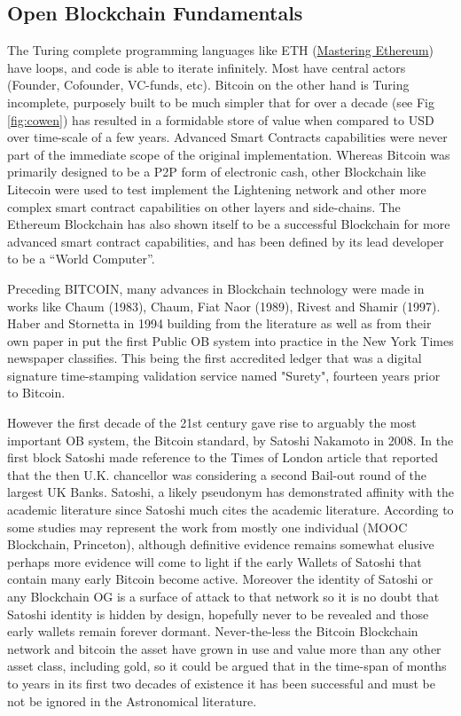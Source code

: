 \documentclass[final,5p,times,twocolumn,authoryear]{elsarticle}
\begin{document}
\subsection{Open Blockchain Fundamentals}
\label{subsec:fundamentals}

The Turing complete programming languages like ETH (\href{https://github.com/ethereumbook/ethereumbook#readme}{Mastering Ethereum}) have loops, and code is able to iterate infinitely. Most have central actors (Founder, Cofounder, VC-funds, etc). Bitcoin on the other hand is Turing incomplete, purposely built to be much simpler that for over a decade (see Fig \ref{fig:cowen}) has resulted in a formidable store of value when compared to USD over time-scale of a few years. Advanced Smart Contracts capabilities were never part of the immediate scope of the original implementation. Whereas Bitcoin was primarily designed to be a P2P form of electronic cash, other Blockchain like Litecoin were used to test implement the Lightening network and other more complex smart contract capabilities on other layers and side-chains. The Ethereum Blockchain has also shown itself to be a successful Blockchain for more advanced smart contract capabilities, and has been defined by its lead developer to be a “World Computer”. 
 

Preceding BITCOIN, many advances in Blockchain technology were made in works like Chaum (1983), Chaum, Fiat Naor (1989), Rivest and Shamir (1997). Haber and Stornetta in 1994 building from the literature as well as from their own paper in \cite{Haber1991wi} put the first Public OB system into practice in the New York Times newspaper classifies. This being the first accredited ledger that was a digital signature time-stamping validation service named "Surety", fourteen years prior to Bitcoin. 

However the first decade of the 21st century gave rise to arguably the most important OB system, the Bitcoin standard, by Satoshi Nakamoto in 2008.  In the first block Satoshi made reference to the Times of London article that reported that the then U.K. chancellor was considering a second Bail-out round of the largest UK Banks. Satoshi, a likely pseudonym has demonstrated affinity with the academic literature since Satoshi much cites the academic literature. According to some studies may represent the work from mostly one individual (MOOC Blockchain, Princeton), although definitive evidence remains somewhat elusive perhaps more evidence will come to light if the early Wallets of Satoshi that contain many early Bitcoin become active. Moreover the identity of Satoshi or any Blockchain OG is a surface of attack to that network so it is no doubt that Satoshi identity is hidden by design, hopefully never to be revealed and those early wallets remain forever dormant. Never-the-less the Bitcoin Blockchain network and bitcoin the asset have grown in use and value more than any other asset class, including gold, so it could be argued that in the time-span of months to years in its first two decades of existence it has been successful and must be not be ignored in the Astronomical literature.
\end{document}
